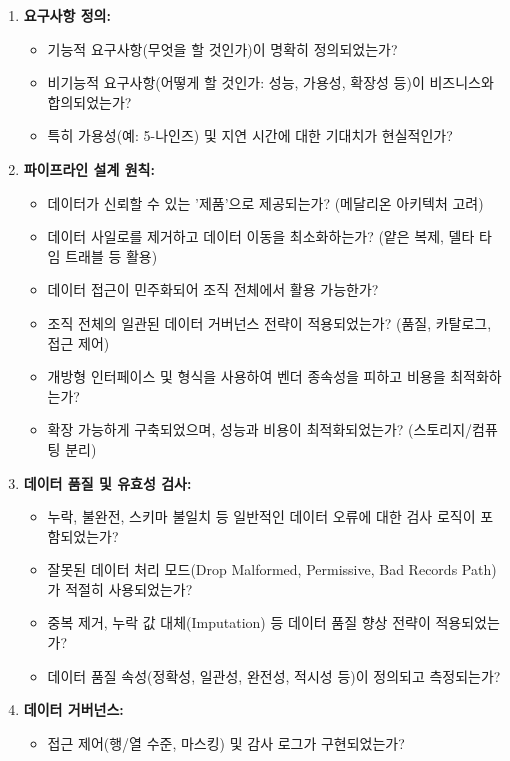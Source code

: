 \documentclass[11pt,a4paper]{article}
\theoremstyle{definition}
\begin{document}
\begin{enumerate}
\begin{enumerate}
    \item \textbf{요구사항 정의:}
    \begin{itemize}
        \item 기능적 요구사항(무엇을 할 것인가)이 명확히 정의되었는가?
        \item 비기능적 요구사항(어떻게 할 것인가: 성능, 가용성, 확장성 등)이 비즈니스와 합의되었는가?
        \item 특히 가용성(예: 5-나인즈) 및 지연 시간에 대한 기대치가 현실적인가?
    \end{itemize}
    \item \textbf{파이프라인 설계 원칙:}
    \begin{itemize}
        \item 데이터가 신뢰할 수 있는 '제품'으로 제공되는가? (메달리온 아키텍처 고려)
        \item 데이터 사일로를 제거하고 데이터 이동을 최소화하는가? (얕은 복제, 델타 타임 트래블 등 활용)
        \item 데이터 접근이 민주화되어 조직 전체에서 활용 가능한가?
        \item 조직 전체의 일관된 데이터 거버넌스 전략이 적용되었는가? (품질, 카탈로그, 접근 제어)
        \item 개방형 인터페이스 및 형식을 사용하여 벤더 종속성을 피하고 비용을 최적화하는가?
        \item 확장 가능하게 구축되었으며, 성능과 비용이 최적화되었는가? (스토리지/컴퓨팅 분리)
    \end{itemize}
    \item \textbf{데이터 품질 및 유효성 검사:}
    \begin{itemize}
        \item 누락, 불완전, 스키마 불일치 등 일반적인 데이터 오류에 대한 검사 로직이 포함되었는가?
        \item 잘못된 데이터 처리 모드(Drop Malformed, Permissive, Bad Records Path)가 적절히 사용되었는가?
        \item 중복 제거, 누락 값 대체(Imputation) 등 데이터 품질 향상 전략이 적용되었는가?
        \item 데이터 품질 속성(정확성, 일관성, 완전성, 적시성 등)이 정의되고 측정되는가?
    \end{itemize}
    \item \textbf{데이터 거버넌스:}
    \begin{itemize}
        \item 접근 제어(행/열 수준, 마스킹) 및 감사 로그가 구현되었는가?

\end{itemize}
\end{enumerate}
\end{enumerate}
\end{document}
